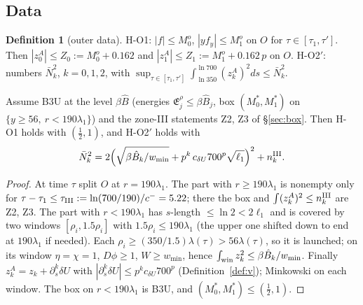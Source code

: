 \documentclass[11pt]{article}
\theoremstyle{definition}\newtheorem{definition}[theorem]{Definition}
\theoremstyle{remark}\newtheorem{remark}[theorem]{Remark}
\newcommand{\E}{\mathfrak E}\newcommand{\B}{\mathfrak B}\newcommand{\Bh}{\hat B}\newcommand{\Eh}{\hat E^A}
\newcommand{\Nb}{\bar N}\newcommand{\oh}{\hat o}
\begin{document}
\subsection{Data}
\begin{definition}[outer data]\label{def:N}
\textup{H-O1:} $|f|\le M_0^o$, $|yf_y|\le M_1^o$ on $O$ for $\tau\in[\tau_1,\tau']$. Then $|z^A_0|\le Z_0:=M_0^o+0.162$ and $|z^A_1|\le Z_1:=M_1^o+0.162\,p$ on $O$.
\textup{H-O2$'$:} numbers $\Nb_k^2$, $k=0,1,2$, with $\sup_{\tau\in[\tau_1,\tau']}\int_{\ln350}^{\ln700}(z^A_k)^2ds\le\Nb_k^2$.
\end{definition}
\begin{lemma}[H-O derived]\label{lem:N}
Assume \textup{B3U} at the level $\beta\Bh$ \textup{(}energies $\E^\rho_j\le\beta\Bh_j$, box $(M_0^*,M_1^*)$ on $\{y\ge56,\ r<190\lambda_1\}$\textup{)} and the zone-III statements \textup{Z2, Z3} of \S\ref{sec:box}. Then \textup{H-O1} holds with $(\frac12,1)$, and \textup{H-O2$'$} holds with
\[
\Nb_k^2=2\Bigl(\sqrt{\beta\Bh_k/w_{\min}}+p^k\,c_{\delta U}700^p\sqrt{\ell_1}\Bigr)^2+n^{\rm III}_k .
\]
\end{lemma}
\begin{proof}
At time $\tau$ split $O$ at $r=190\lambda_1$. The part with $r\ge190\lambda_1$ is nonempty only for $\tau-\tau_1\le\tau_{\rm III}:=\ln(700/190)/c^-=5.22$; there the box and $\int(z_k^A)^2\le n^{\rm III}_k$ are Z2, Z3. The part with $r<190\lambda_1$ has $s$-length $\le\ln2<2\ell_1$ and is covered by two windows $[\rho_i,1.5\rho_i]$ with $1.5\rho_i\le190\lambda_1$ (the upper one shifted down to end at $190\lambda_1$ if needed). Each $\rho_i\ge(350/1.5)\lambda(\tau)>56\lambda(\tau)$, so it is launched; on its window $\eta=\chi=1$, $D\phi\ge1$, $W\ge w_{\min}$, hence $\int_{\rm win}z_k^2\le\beta\Bh_k/w_{\min}$. Finally $z^A_k=z_k+\partial_s^k\delta U$ with $|\partial_s^k\delta U|\le p^kc_{\delta U}700^p$ (Definition~\ref{def:v}); Minkowski on each window. The box on $r<190\lambda_1$ is B3U, and $(M_0^*,M_1^*)\le(\frac12,1)$.
\end{proof}
\end{document}

